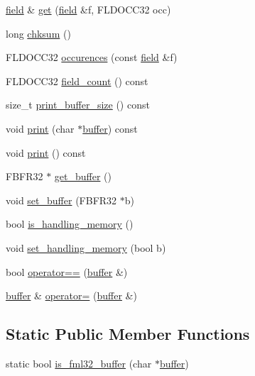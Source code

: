 \begin{DoxyCompactItemize}
\item 
\hyperlink{classatmi_1_1field}{field} \& \hyperlink{classatmi_1_1buffer_a864adb4d0153e6be38a7905c994915e1}{get} (\hyperlink{classatmi_1_1field}{field} \&f, F\+L\+D\+O\+C\+C32 occ)
\item 
long \hyperlink{classatmi_1_1buffer_a4ae9fa419098eb136ae3681ad90ccafb}{chksum} ()
\item 
F\+L\+D\+O\+C\+C32 \hyperlink{classatmi_1_1buffer_a57ff1b2ed449d59d4ec936e9e79a5d1a}{occurences} (const \hyperlink{classatmi_1_1field}{field} \&f)
\item 
F\+L\+D\+O\+C\+C32 \hyperlink{classatmi_1_1buffer_a74a6ff6ab31eb1128fc2f40d2a8e020f}{field\+\_\+count} () const 
\item 
size\+\_\+t \hyperlink{classatmi_1_1buffer_ae315c028b78f321abce6d9be2e026813}{print\+\_\+buffer\+\_\+size} () const 
\item 
void \hyperlink{classatmi_1_1buffer_ad7b1a3f9005926e07d00393aa6300f39}{print} (char $\ast$\hyperlink{classatmi_1_1buffer}{buffer}) const 
\item 
void \hyperlink{classatmi_1_1buffer_aa5f087559f5f3fb4f383121f78f2c461}{print} () const 
\item 
F\+B\+F\+R32 $\ast$ \hyperlink{classatmi_1_1buffer_aa9aa5382717ed17a2047db2779f8f0ec}{get\+\_\+buffer} ()
\item 
void \hyperlink{classatmi_1_1buffer_ade8853e7c2ae10dcd024b34049e99af3}{set\+\_\+buffer} (F\+B\+F\+R32 $\ast$b)
\item 
bool \hyperlink{classatmi_1_1buffer_aae543cf7816b338d20031993c18ce491}{is\+\_\+handling\+\_\+memory} ()
\item 
void \hyperlink{classatmi_1_1buffer_a68f05d1dbd040062850feeba5aa188fc}{set\+\_\+handling\+\_\+memory} (bool b)
\item 
bool \hyperlink{classatmi_1_1buffer_a580571a4a3cf75eafe90543e9ab07333}{operator==} (\hyperlink{classatmi_1_1buffer}{buffer} \&)
\item 
\hyperlink{classatmi_1_1buffer}{buffer} \& \hyperlink{classatmi_1_1buffer_a5cb08586cc2e633a3b0e80755dda53cd}{operator=} (\hyperlink{classatmi_1_1buffer}{buffer} \&)
\end{DoxyCompactItemize}
\subsection*{Static Public Member Functions}
\begin{DoxyCompactItemize}
\item 
static bool \hyperlink{classatmi_1_1buffer_a38aca9956db23474cb19d4c737b08262}{is\+\_\+fml32\+\_\+buffer} (char $\ast$\hyperlink{classatmi_1_1buffer}{buffer})
\end{DoxyCompactItemize}
